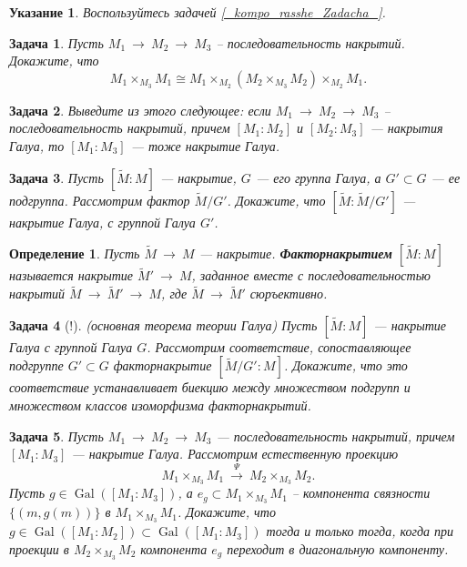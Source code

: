 \documentclass[12pt]{book}
\newcommand{\arrow}{{\:\longrightarrow\:}}
\newcommand{\Gal}{\operatorname{Gal}}
\theoremstyle{upshape}
\newtheorem{zadacha}{Задача}[chapter]
\theoremstyle{generic}
\newtheorem{opredelenie}[teorema]{Определение}
\theoremstyle{upshapenonumber}
\newtheorem{ukazanie}{Указание}[section]
\newcommand{\следствие}{%
     \refstepcounter{teorema}
     {\noindent\bf Следствие \thechapter.\arabic{teorema}:\ }}
\newcommand{\пример}{%
     \refstepcounter{teorema}
     {\noindent\bf Пример \thechapter.\arabic{teorema}:\ }}
\newcommand{\лемма}{%
     \refstepcounter{teorema}
     {\noindent\bf Лемма \thechapter.\arabic{teorema}:\ }}
\newcommand{\теорема}{%
     \refstepcounter{teorema}
     {\noindent\bf Теорема \thechapter.\arabic{teorema}:\ }}
\newcommand{\утверждение}{%
     \refstepcounter{teorema}
     {\noindent\bf Утверждение \thechapter.\arabic{teorema}:\ }}
\begin{document}
{\begin{ukazanie}
Воспользуйтесь  задачей \ref{_kompo_rasshe_Zadacha_}.
\end{ukazanie}

\begin{zadacha} 
Пусть $M_1\arrow M_2 \arrow M_3$ --
последовательность накрытий. Докажите, что 
\[ M_1\times_{M_3} M_1 \cong 
   M_1\times_{M_2} (M_2\times_{M_3}M_2)\times_{M_2}M_1.
\]
\end{zadacha}

\begin{zadacha} Выведите из этого следующее:
если $M_1\arrow M_2 \arrow M_3$ --
последовательность накрытий, причем $[M_1:M_2]$
и $[M_2:M_3]$ --- накрытия Галуа, то $[M_1:M_3]$ --- тоже
накрытие Галуа.
\end{zadacha}

\begin{zadacha} 
Пусть $[\tilde M:M]$ --- накрытие,
$G$ --- его группа Галуа, а $G'\subset G$ --- ее подгруппа.
Рассмотрим фактор $\tilde M/G'$. Докажите, что
$[\tilde M: \tilde M/G']$ --- накрытие Галуа,
с группой Галуа $G'$.
\end{zadacha}

\begin{opredelenie}
Пусть $\tilde M \arrow M$ --- накрытие. 
{\bf Факторнакрытием} $[\tilde M:M]$
называется накрытие $\tilde M'\arrow M$,
заданное вместе с последовательностью накрытий
$\tilde M \arrow \tilde M' \arrow M$, где
$\tilde M \arrow \tilde M'$ сюръективно.
\end{opredelenie}

\begin{zadacha}[!]
(основная теорема теории Галуа)
Пусть $[\tilde M:M]$ --- накрытие Галуа с группой
Галуа $G$. Рассмотрим соответствие, сопоставляющее
подгруппе $G'\subset G$
факторнакрытие $[\tilde M/G':M]$.
Докажите, что это соответствие
устанавливает биекцию между 
множеством подгрупп и множеством
классов изоморфизма факторнакрытий.
\end{zadacha}

\begin{zadacha} 
Пусть $M_1\arrow M_2 \arrow M_3$ --- последовательность
накрытий, причем $[M_1:M_3]$ --- накрытие Галуа.
Рассмотрим естественную проекцию 
\[ M_1 \times_{M_3} M_1 \stackrel\Psi\arrow  M_2 \times_{M_3} M_2.
\]
Пусть $g\in \Gal([M_1:M_3])$, а $e_g\subset M_1 \times_{M_3} M_1$
--  компонента связности 
$\{(m, g(m))\}$ в $M_1 \times_{M_3} M_1$.
Докажите, что $g\in \Gal([M_1:M_2])\subset \Gal([M_1:M_3])$
тогда и только тогда, когда при проекции в
$M_2 \times_{M_3} M_2$ компонента $e_g$
переходит в диагональную компоненту.
\end{zadacha}

}
\end{document}
